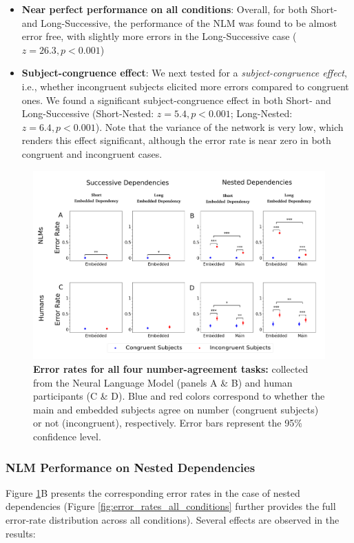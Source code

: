 \begin{itemize}
    \item \textbf{Near perfect performance on all conditions}: Overall, for both Short- and Long-Successive, the performance of the NLM was found to be almost error free, with slightly more errors in the Long-Successive case ($z=26.3, p<0.001$)
    \item \textbf{Subject-congruence effect}: We next tested for a \textit{subject-congruence effect}, i.e., whether incongruent subjects elicited more errors compared to congruent ones. We found a significant subject-congruence effect in both Short- and Long-Successive (Short-Nested: $z=5.4, p<0.001$; Long-Nested: $z=6.4, p<0.001$). Note that the variance of the network is very low, which renders this effect significant, although the error rate is near zero in both congruent and incongruent cases.
\end{itemize}
 
 \begin{figure}[ht]
    \centering
    \includegraphics[width=16cm]{figures/error_rates_plural_attractor.png}
    \caption{\textbf{Error rates for all four number-agreement tasks:} collected from the Neural Language Model (panels A \& B) and human participants (C \& D). Blue and red colors correspond to whether the main and embedded subjects agree on number (congruent subjects) or not (incongruent), respectively. Error bars represent the 95\% confidence level.}
    \label{fig:error_rates_plural_attractor}
\end{figure}


\subsubsection{NLM Performance on Nested Dependencies}
Figure \ref{fig:error_rates_plural_attractor}B presents the corresponding error rates in the case of nested dependencies (Figure \ref{fig:error_rates_all_conditions} further provides the full error-rate distribution across all conditions). Several effects are observed in the results:

